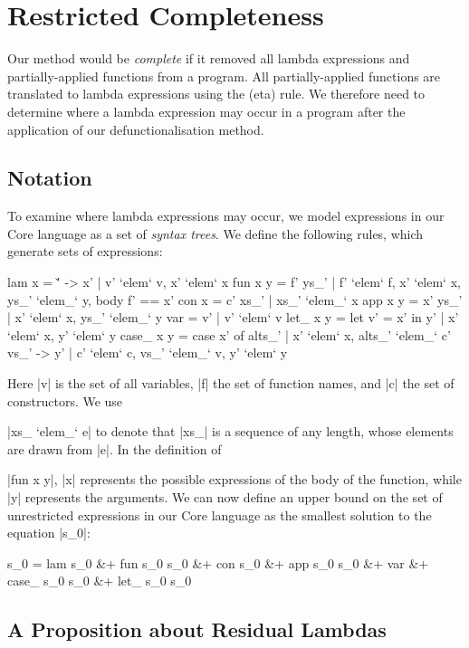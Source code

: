 \section{Restricted Completeness}
\label{secF:completeness}

Our method would be \textit{complete} if it removed all lambda expressions and partially-applied functions from a program. All partially-applied functions are translated to lambda expressions using the (eta) rule. We therefore need to determine where a lambda expression may occur in a program after the application of our defunctionalisation method.

\subsection{Notation}

To examine where lambda expressions may occur, we model expressions in our Core language as a set of \textit{syntax trees}. We define the following rules, which generate sets of expressions:

\ignore\begin{code}
lam x      = {\v' -> x' | v' `elem` v, x' `elem` x}
fun x y    = {f' ys_' | f' `elem` f, x' `elem` x, ys_' `elem_` y, body f' == x'}
con x      = {c' xs_' | xs_' `elem_` x}
app x y    = {x' ys_' | x' `elem` x, ys_' `elem_` y}
var        = {v' | v' `elem` v}
let_ x y   = {let v' = x' in y' | x' `elem` x, y' `elem` y}
case_ x y  = {case  x' of alts_' | x' `elem` x,
                    alts_' `elem_` {c' vs_' -> y' | c' `elem` c, vs_' `elem_` v, y' `elem` y}}
\end{code}

Here |v| is the set of all variables, |f| the set of function names, and |c| the set of constructors. We use \ignore|xs_ `elem_` e| to denote that |xs_| is a sequence of any length, whose elements are drawn from |e|. In the definition of \ignore|fun x y|, |x| represents the possible expressions of the body of the function, while |y| represents the arguments. We can now define an upper bound on the set of unrestricted expressions in our Core language as the smallest solution to the equation |s_0|:

\ignore\begin{code}
s_0  =  lam s_0 &+ fun s_0 s_0 &+ con s_0 &+ app s_0 s_0 &+ var &+
        case_ s_0 s_0 &+ let_ s_0 s_0
\end{code}

\subsection{A Proposition about Residual Lambdas}

